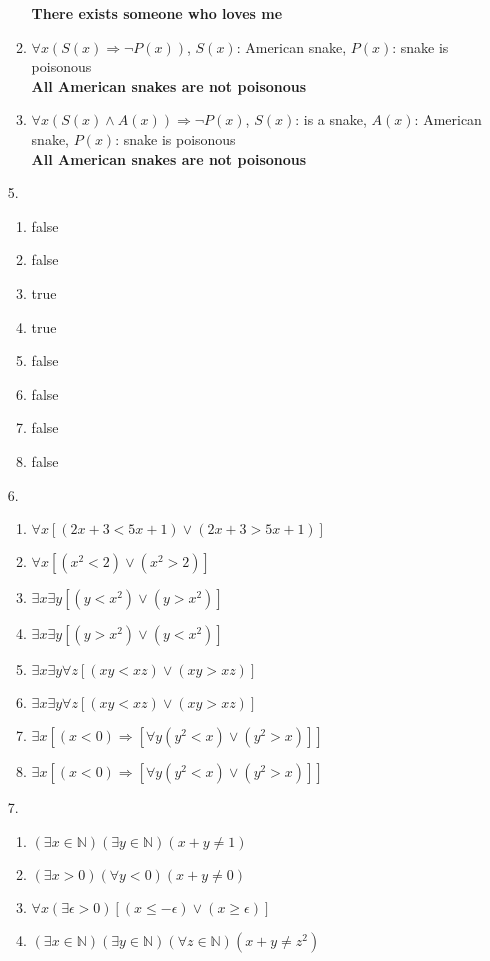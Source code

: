 \documentclass[11pt]{exam}
\begin{document}
\begin{enumerate}[leftmargin=0pt]
\begin{enumerate}[label=(\alph*)]
    \textbf{There exists someone who loves me}
    \item $\forall x (S(x) \Rightarrow \neg P(x))$, $S(x)$: American snake, $P(x)$: snake is poisonous \\
    \textbf{All American snakes are not poisonous}
    \item $\forall x (S(x) \land A(x)) \Rightarrow \neg P(x)$, $S(x)$: is a snake, $A(x)$: American snake, $P(x)$: snake is poisonous \\
    \textbf{All American snakes are not poisonous}
\end{enumerate}

\item[5.]
\begin{enumerate}[label=(\alph*)]
    \item false
    \item false
    \item true
    \item true
    \item false
    \item false
    \item false
    \item false
\end{enumerate}

\item[6.]
\begin{enumerate}[label=(\alph*)]
    \item $\forall x [(2x + 3 < 5x + 1) \lor (2x + 3 > 5x + 1)]$
    \item $\forall x [(x^2 < 2) \lor (x^2 > 2)]$
    \item $\exists x \exists y [(y < x^2) \lor (y > x^2)]$
    \item $\exists x \exists y [(y > x^2) \lor (y < x^2)]$
    \item $\exists x \exists y \forall z [(xy < xz) \lor (xy > xz)]$
    \item $\exists x \exists y \forall z [(xy < xz) \lor (xy > xz)]$
    \item $\exists x [(x < 0) \Rightarrow [\forall y (y^2 < x) \lor (y^2 > x)]]$
    \item $\exists x [(x < 0) \Rightarrow [\forall y (y^2 < x) \lor (y^2 > x)]]$
\end{enumerate}

\item[7.]
\begin{enumerate}[label=(\alph*)]
    \item $(\exists x \in \mathbb{N})(\exists y \in \mathbb{N})(x + y \neq 1)$
    \item $(\exists x > 0)(\forall y < 0)(x + y \neq 0)$
    \item $\forall x (\exists \epsilon > 0)[(x \leq -\epsilon) \lor (x \geq \epsilon)]$
    \item $(\exists x \in \mathbb{N})(\exists y \in \mathbb{N})(\forall z \in \mathbb{N})(x + y \neq z^2)$
\end{enumerate}


\end{enumerate}
\end{document}
